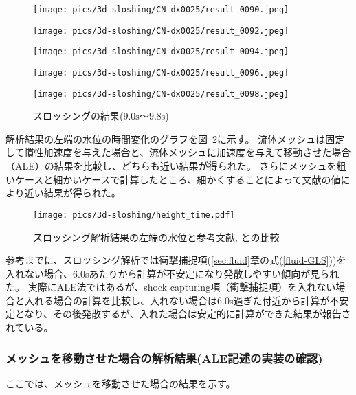 \begin{figure}[H]
	\centering
	\begin{minipage}[b]{0.19\columnwidth}
	    \centering
	    \texttt{[image: pics/3d-sloshing/CN-dx0025/result\_0090.jpeg]}
	\end{minipage}
	\begin{minipage}[b]{0.19\columnwidth}
	    \centering
	    \texttt{[image: pics/3d-sloshing/CN-dx0025/result\_0092.jpeg]}
	\end{minipage}
	\begin{minipage}[b]{0.19\columnwidth}
	    \centering
	    \texttt{[image: pics/3d-sloshing/CN-dx0025/result\_0094.jpeg]}
	\end{minipage}
	\begin{minipage}[b]{0.19\columnwidth}
	    \centering
	    \texttt{[image: pics/3d-sloshing/CN-dx0025/result\_0096.jpeg]}
	\end{minipage}
	\begin{minipage}[b]{0.19\columnwidth}
	    \centering
	    \texttt{[image: pics/3d-sloshing/CN-dx0025/result\_0098.jpeg]}
	\end{minipage}
	\caption{スロッシングの結果($9.0\mathrm{s}$～$9.8\mathrm{s}$)}
	\label{fig:sloshing-result}
\end{figure}

解析結果の左端の水位の時間変化のグラフを図~\ref{fig:3d-sloshing-result}に示す。
流体メッシュは固定して慣性加速度を与えた場合と、流体メッシュに加速度を与えて移動させた場合（ALE）の結果を比較し、どちらも近い結果が得られた。
さらにメッシュを粗いケースと細かいケースで計算したところ、細かくすることによって文献の値により近い結果が得られた。
\begin{figure}[H]
    \centering
	\texttt{[image: pics/3d-sloshing/height\_time.pdf]}
	\caption{スロッシング解析結果の左端の水位と参考文献\cite{Okamoto1992}, \cite{Sakuraba2001}との比較}
	\label{fig:3d-sloshing-result}
\end{figure}

参考までに、スロッシング解析では衝撃捕捉項(\ref{sec:fluid}章の式(\ref{fluid-GLS}))を入れない場合、6.0sあたりから計算が不安定になり発散しやすい傾向が見られた。
実際にALE法ではあるが、shock capturing項（衝撃捕捉項）を入れない場合と入れる場合の計算を比較し、入れない場合は6.0s過ぎた付近から計算が不安定となり、その後発散するが、入れた場合は安定的に計算ができた結果が報告されている\cite{Sakuraba1999}。

\newpage
\subsubsection{メッシュを移動させた場合の解析結果(ALE記述の実装の確認)}
ここでは、メッシュを移動させた場合の結果を示す。

